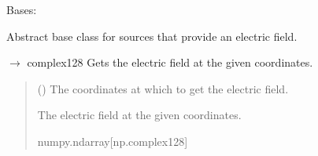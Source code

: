 \documentclass[letterpaper,10pt,english]{sphinxmanual}
\begin{document}
\begin{fulllineitems}
\label{\detokenize{source/Sources:Sources.ElectricFieldSource}}
\pysigstartsignatures
\pysigline
{}
\pysigstopsignatures
\sphinxAtStartPar
Bases: {\hyperref[\detokenize{source/Sources:Sources.Source}]{}}

\sphinxAtStartPar
Abstract base class for sources that provide an electric field.


\begin{fulllineitems}
\label{\detokenize{source/Sources:Sources.ElectricFieldSource.get_electric_field}}
\pysigstartsignatures
\pysiglinewithargsret
{}
{}
{{ $\rightarrow$ complex128}}
\pysigstopsignatures
\sphinxAtStartPar
Gets the electric field at the given coordinates.
\begin{quote}\begin{description}
\sphinxAtStartPar
{} (\sphinxstyleliteralemphasis{\sphinxupquote{{[}}}\sphinxstyleliteralemphasis{\sphinxupquote{{]}}}) \textendash{} The coordinates at which to get the electric field.

\sphinxAtStartPar
The electric field at the given coordinates.

\sphinxAtStartPar
numpy.ndarray{[}np.complex128{]}

\end{description}\end{quote}

\end{fulllineitems}



\end{fulllineitems}
\end{document}
